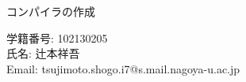 \documentclass[main]{subfiles}
\begin{document}
\begin{titlepage}
    \fontsize{30pt}{30pt}\selectfont

    \centering
    \Huge
    コンパイラの作成\\
    \vspace{30pt}

    \large
    学籍番号: 102130205\\
    氏名: 辻本祥吾\\
    Email: tsujimoto.shogo.i7@s.mail.nagoya-u.ac.jp\\
    \normalsize

\end{titlepage}
\end{document}
